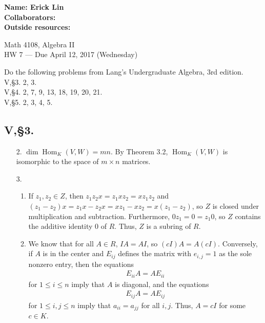 \documentclass[12pt]{article}
\DeclareMathOperator{\Hom}{Hom}
\begin{document}
\noindent
\textbf{Name: Erick Lin} \smallskip  \\
\textbf{Collaborators:} \smallskip \\ %
\textbf{Outside resources:} \smallskip \\ %

\begin{center}
{
Math 4108, Algebra II \\
HW 7 --- Due April 12, 2017 (Wednesday)
}
\end{center}

Do the following problems from Lang's Undergraduate Algebra, 3rd edition.\\
V,\S3. 2, 3.\\
V,\S4. 2, 7, 9, 13, 18, 19, 20, 21.\\
V,\S5. 2, 3, 4, 5.
\subsection*{V,\S3.}
\begin{enumerate}
    \item[2.]
        $\dim\Hom_K(V, W) = mn$. By Theorem 3.2, $\Hom_K(V, W)$ is isomorphic to the space of $m \times n$ matrices.

    \item[3.]
        \begin{enumerate}
            \item
                If $z_1, z_2 \in Z$, then $z_1 z_2 x = z_1 x z_2 = x z_1 z_2$ and $(z_1 - z_2)x = z_1 x - z_2 x = x z_1 - x z_2 = x(z_1 - z_2)$, so $Z$ is closed under multiplication and subtraction. Furthermore, $0 z_1 = 0 = z_1 0$, so $Z$ contains the additive identity $0$ of $R$. Thus, $Z$ is a subring of $R$.
            \item
                We know that for all $A \in R$, $IA = AI$, so $(cI)A = A(cI)$. Conversely, %
                if $A$ is in the center and $E_{ij}$ defines the matrix with $e_{i, j} = 1$ as the sole nonzero entry, then the equations
                \begin{align*}
                    E_{ii}A = AE_{ii}
                \end{align*}
                for $1 \leq i \leq n$ imply that $A$ is diagonal, and the equations
                \begin{align*}
                    E_{ij}A = AE_{ij}
                \end{align*}
                for $1 \leq i, j \leq n$ imply that $a_{ii} = a_{jj}$ for all $i, j$. Thus, $A = cI$ for some $c \in K$.
        \end{enumerate}
\end{enumerate}
\end{document}
